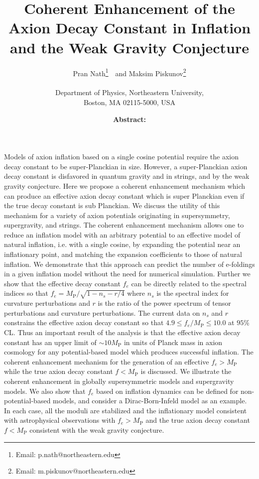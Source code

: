 \documentclass[12pt]{article}
\author{
  Pran Nath\footnote{Email: p.nath@northeastern.edu}~\ and
  Maksim Piskunov\footnote{Email: m.piskunov@northeastern.edu}\\~\\
  Department of Physics, Northeastern University,\\
  Boston, MA 02115-5000, USA
}
\title{
  Coherent Enhancement of the Axion Decay Constant in Inflation and the Weak Gravity Conjecture
}
\begin{document}
\maketitle
\date

\textbf{Abstract:}
Models of axion inflation based on a single cosine potential require the axion decay constant to be super-Planckian in size.
However, a super-Planckian axion decay constant is disfavored in quantum gravity and in strings, and by the weak gravity conjecture.
Here we propose a coherent enhancement mechanism which can produce an effective axion decay constant which is super Planckian even if the true decay constant is sub Planckian.
We discuss the utility of this mechanism for a variety of axion potentials originating in supersymmetry, supergravity, and strings.
The coherent enhancement mechanism allows one to reduce an inflation model with an arbitrary potential to an effective model of natural inflation, i.e. with a single cosine, by expanding the potential near an inflationary point, and matching the expansion coefficients to those of natural inflation.
We demonstrate that this approach can predict the number of e-foldings in a given inflation model without the need for numerical simulation.
Further we show that the effective decay constant $f_e$ can be directly related to the spectral indices so that $f_e = M_\text{P} / \sqrt{1 - n_s - r / 4}$ where $n_s$ is the spectral index for curvature perturbations and $r$ is the ratio of the power spectrum of tensor perturbations and curvature perturbations.
The current data on $n_s$ and $r$ constrains the effective axion decay constant so that $4.9 \leq f_e / M_\text{P} \leq 10.0$ at $95\%$ CL.
Thus an important result of the analysis is that the effective axion decay constant has an upper limit of $\sim 10 M_\text{P}$ in units of Planck mass in axion cosmology for any potential-based model which produces successful inflation.
The coherent enhancement mechanism for the generation of an effective $f_e > M_\text{P}$ while the true axion decay constant $f < M_\text{P}$ is discussed.
We illustrate the coherent enhancement in globally supersymmetric models and supergravity models.
We also show that $f_e$ based on inflation dynamics can be defined for non-potential-based models, and consider a Dirac-Born-Infeld model as an example.
In each case, all the moduli are stabilized and the inflationary model consistent with astrophysical observations with $f_e > M_\text{P}$ and the true axion decay constant $f < M_\text{P}$ consistent with the weak gravity conjecture.
\newpage
\end{document}
